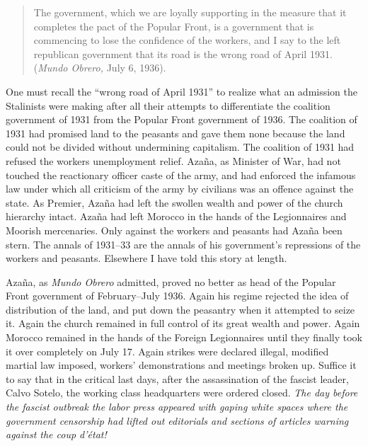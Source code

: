 \indexMundoObrero
\begin{quotation}
  The government, which we are loyally supporting in the measure that it completes the pact of the Popular Front, is a government that is commencing to lose the confidence of the workers, and I say to the left republican government that its road is the wrong road of April 1931. (\emph{Mundo Obrero,} July 6, 1936).
\end{quotation}

One must recall the ``wrong road of April 1931'' to realize what an admission the Stalinists were making after all their attempts to differentiate the coalition government of 1931 from the Popular Front government of 1936. The coalition of 1931 had promised land to the peasants and gave them none because the land could not be divided without undermining capitalism. The coalition of 1931 had refused the workers unemployment relief. Azaña, as Minister of War, had not touched the reactionary officer caste of the army, and had enforced the infamous law under which all criticism of the army by civilians was an offence against the state. As Premier, Azaña had left the swollen wealth and power of the church hierarchy intact. Azaña had left Morocco in the hands of the Legionnaires and Moorish mercenaries. Only against the workers and peasants had Azaña been stern. The annals of 1931--33 are the annals of his government’s repressions of the workers and peasants. Elsewhere I have told this story at length.\label{en:CivilWarReference}

Azaña, as \emph{Mundo Obrero} admitted, proved no better as head of the Popular Front government of February--July 1936. Again his regime rejected the idea of distribution of the land, and put down the peasantry when it attempted to seize it. Again the church remained in full control of its great wealth and power. Again Morocco remained in the hands of the Foreign Legionnaires until they finally took it over completely on July 17. Again strikes were declared illegal, modified martial law imposed, workers’ demonstrations and meetings broken up. Suffice it to say that in the critical last days, after the assassination of the fascist leader, Calvo Sotelo, the working class headquarters were ordered closed. \emph{The day before the fascist outbreak the labor press appeared with gaping white spaces where the government censorship had lifted out editorials and sections of articles warning against the coup d’\'etat!}

